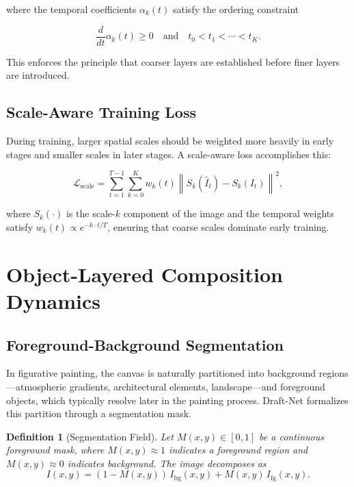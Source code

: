 \documentclass[12pt,a4paper]{article}
\theoremstyle{draftthm}
\newtheorem{definition}{Definition}[section]
\newcommand{\norm}[1]{\left\|#1\right\|}
\begin{document}
where the temporal coefficients $\alpha_k(t)$ satisfy the ordering constraint

\begin{equation}
  \frac{d}{dt} \alpha_k(t) \geq 0 \quad \text{and} \quad t_0 < t_1 < \cdots < t_K.
\end{equation}

This enforces the principle that coarser layers are established before finer layers are introduced.

\subsection{Scale-Aware Training Loss}

During training, larger spatial scales should be weighted more heavily in early stages and smaller scales in later stages. A scale-aware loss accomplishes this:

\begin{equation}
  \mathcal{L}_{\mathrm{scale}}
  =
  \sum_{t=1}^{T-1}
  \sum_{k=0}^{K}
  w_k(t)
  \norm{S_k(\hat{I}_t) - S_k(I_t)}^2,
  \label{eq:scale-loss}
\end{equation}

where $S_k(\cdot)$ is the scale-$k$ component of the image and the temporal weights satisfy $w_k(t) \propto e^{-k \cdot t/T}$, ensuring that coarse scales dominate early training.

\section{Object-Layered Composition Dynamics}

\subsection{Foreground-Background Segmentation}

In figurative painting, the canvas is naturally partitioned into background regions---atmospheric gradients, architectural elements, landscape---and foreground objects, which typically resolve later in the painting process. Draft-Net formalizes this partition through a segmentation mask.

\begin{definition}[Segmentation Field]
  Let $M(x,y) \in [0,1]$ be a continuous \emph{foreground mask}, where $M(x,y) \approx 1$ indicates a foreground region and $M(x,y) \approx 0$ indicates background. The image decomposes as
  \begin{equation}
    I(x,y) = (1-M(x,y))\, I_{\mathrm{bg}}(x,y) + M(x,y)\, I_{\mathrm{fg}}(x,y).
    \label{eq:image-decomp}
  \end{equation}
\end{definition}
\end{document}
